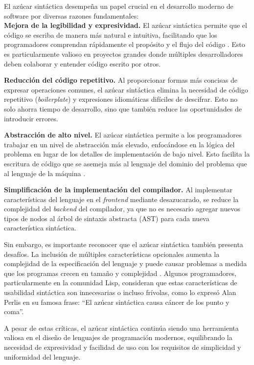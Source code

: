 \documentclass[a4paper,12pt]{article}
\begin{document}
El azúcar sintáctica desempeña un papel crucial en el desarrollo moderno de software por diversas razones fundamentales:\\

\textbf{Mejora de la legibilidad y expresividad.} El azúcar sintáctica permite que el código se escriba de manera más natural e intuitiva, facilitando que los programadores comprendan rápidamente el propósito y el flujo del código \cite{WikiSintaxis,Rathi2020}. Esto es particularmente valioso en proyectos grandes donde múltiples desarrolladores deben colaborar y entender código escrito por otros.

\textbf{Reducción del código repetitivo.} Al proporcionar formas más concisas de expresar operaciones comunes, el azúcar sintáctica elimina la necesidad de código repetitivo (\textit{boilerplate}) y expresiones idiomáticas difíciles de descifrar. Esto no solo ahorra tiempo de desarrollo, sino que también reduce las oportunidades de introducir errores.

\textbf{Abstracción de alto nivel.} El azúcar sintáctica permite a los programadores trabajar en un nivel de abstracción más elevado, enfocándose en la lógica del problema en lugar de los detalles de implementación de bajo nivel. Esto facilita la escritura de código que se asemeja más al lenguaje del dominio del problema que al lenguaje de la máquina \cite{OpenStax,WikiSintaxis}.

\textbf{Simplificación de la implementación del compilador.} Al implementar características del lenguaje en el \textit{frontend} mediante desazucarado, se reduce la complejidad del \textit{backend} del compilador, ya que no es necesario agregar nuevos tipos de nodos al árbol de sintaxis abstracta (AST) para cada nueva característica sintáctica.

Sin embargo, es importante reconocer que el azúcar sintáctica también presenta desafíos. La inclusión de múltiples características opcionales aumenta la complejidad de la especificación del lenguaje y puede causar problemas a medida que los programas crecen en tamaño y complejidad \cite{WikiSintaxis}. Algunos programadores, particularmente en la comunidad Lisp, consideran que estas características de usabilidad sintáctica son innecesarias o incluso frívolas, como lo expresó Alan Perlis en su famosa frase: ``El azúcar sintáctica causa cáncer de los punto y coma''.

A pesar de estas críticas, el azúcar sintáctica continúa siendo una herramienta valiosa en el diseño de lenguajes de programación modernos, equilibrando la necesidad de expresividad y facilidad de uso con los requisitos de simplicidad y uniformidad del lenguaje.
\end{document}
